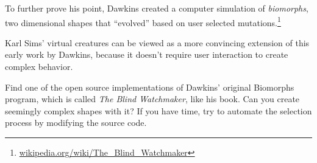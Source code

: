 To further prove his point, Dawkins created a computer simulation of {\em
biomorphs}, two dimensional shapes that ``evolved'' based on user selected
mutations.\footnote{\url{wikipedia.org/wiki/The_Blind_Watchmaker}}

Karl Sims' virtual creatures can be viewed as a more convincing extension of this early work by
Dawkins, because it doesn't require user interaction to create complex behavior.

\begin{ex}
  Find one of the open source implementations of Dawkins' original Biomorphs
  program, which is called {\em The Blind Watchmaker}, like his book. Can you create 
  seemingly complex shapes with it? If you have time, try to automate the selection process
  by modifying the source code. 
\end{ex}
